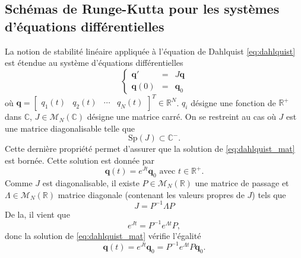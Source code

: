 \subsection{Schémas de Runge-Kutta pour les systèmes d'équations différentielles}

La notion de stabilité linéaire appliquée à l'équation de Dahlquist \eqref{eq:dahlquist} est étendue au système d'équations différentielles
\begin{equation}
\left\lbrace
\begin{array}{rcl}
\mathbf{q}' & = & J \mathbf{q} \\
\mathbf{q}(0) & = & \mathbf{q}_0 
\end{array}
\right.
\label{eq:dahlquist_mat}
\end{equation}
où $\mathbf{q} = \begin{bmatrix}
q_1(t) & q_2(t) & \cdots & q_N(t)
\end{bmatrix}^T \in \mathbb{R}^N$.
$q_i$ désigne une fonction de $\mathbb{R}^+$ dans $\mathbb{C}$, $J \in \mathcal{M}_N (\mathbb{C})$ désigne une matrice carré. On se restreint au cas où $J$ est une matrice diagonalisable telle que 
\begin{equation}
\text{Sp}(J) \subset \mathbb{C}^-.
\end{equation}
Cette dernière propriété permet d'assurer que la solution de \eqref{eq:dahlquist_mat} est bornée. Cette solution est donnée par 
\begin{equation}
\mathbf{q}(t) = e^{Jt}\mathbf{q}_0 \text{ avec } t \in \mathbb{R}^+.
\end{equation}
Comme $J$ est diagonalisable, il existe $P \in \mathcal{M}_N(\mathbb{R})$ une matrice de passage et $\Lambda \in \mathcal{M}_N(\mathbb{R})$ matrice diagonale (contenant les valeurs propres de $J$) tels que
\begin{equation}
J = P^{-1}\Lambda P
\end{equation}
De la, il vient que 
\begin{equation}
e^{Jt} = P^{-1}e^{\Lambda t}P,
\end{equation}
donc la solution de \eqref{eq:dahlquist_mat} vérifie l'égalité 
\begin{equation}
\mathbf{q}(t) = e^{Jt}\mathbf{q}_0 = P^{-1}e^{\Lambda t}P\mathbf{q}_0.
\end{equation}

